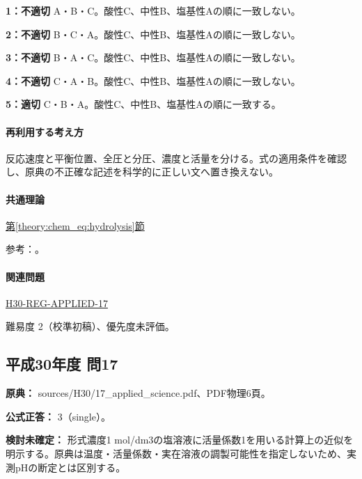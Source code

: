 \noindent\textbf{1：不適切} A・B・C。酸性C、中性B、塩基性Aの順に一致しない。\par

\noindent\textbf{2：不適切} B・C・A。酸性C、中性B、塩基性Aの順に一致しない。\par

\noindent\textbf{3：不適切} B・A・C。酸性C、中性B、塩基性Aの順に一致しない。\par

\noindent\textbf{4：不適切} C・A・B。酸性C、中性B、塩基性Aの順に一致しない。\par

\noindent\textbf{5：適切} C・B・A。酸性C、中性B、塩基性Aの順に一致する。\par

\paragraph{再利用する考え方} 反応速度と平衡位置、全圧と分圧、濃度と活量を分ける。式の適用条件を確認し、原典の不正確な記述を科学的に正しい文へ置き換えない。

\paragraph{共通理論} \hyperref[theory:chem_eq:hydrolysis]{第\ref*{theory:chem_eq:hydrolysis}節}

\par 参考：\cite{iupac_greenbook2012,mit_buffer2008}。

\paragraph{関連問題} \hyperref[q:h30-reg-applied-17]{H30-REG-APPLIED-17}

\par 難易度 2（校準初稿）、優先度未評価。

\subsection{平成30年度 問17}
\label{q:h30-reg-applied-17}

\noindent\textbf{原典：} sources/H30/17\_applied\_science.pdf、PDF物理6頁。

\textbf{公式正答：} 3（single）。

\par\textbf{検討未確定：} 形式濃度1 mol/dm3の塩溶液に活量係数1を用いる計算上の近似を明示する。原典は温度・活量係数・実在溶液の調製可能性を指定しないため、実測pHの断定とは区別する。

